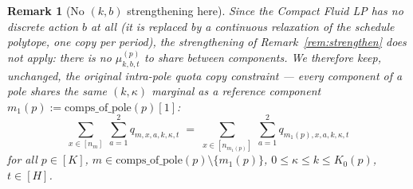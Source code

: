 \documentclass[11pt]{article}
\newtheorem{remark}{Remark}
\begin{document}
\begin{remark}[No $(k,b)$ strengthening here]
Since the Compact Fluid LP has no discrete action $b$ at all (it is replaced by a
continuous relaxation of the schedule polytope, one copy per period), the strengthening of
Remark~\ref{rem:strengthen} does not apply: there is no $\mu^{(p)}_{k,b,t}$ to share
between components. We therefore keep, unchanged, the original \emph{intra-pole quota
copy} constraint --- every component of a pole shares the same $(k,\kappa)$ marginal as a
reference component $m_1(p) := \mathrm{comps\_of\_pole}(p)[1]$:
\[
  \sum_{x \in [n_m]}\ \sum_{a=1}^{2} q_{m,x,a,k,\kappa,t}
  \;=\;
  \sum_{x \in [n_{m_1(p)}]}\ \sum_{a=1}^{2} q_{m_1(p),x,a,k,\kappa,t}
  \tag{Quota-copy}
\]
for all $p \in [K]$, $m \in \mathrm{comps\_of\_pole}(p) \setminus \{m_1(p)\}$,
$0 \le \kappa \le k \le K_0(p)$, $t \in [H]$.
\end{remark}
\end{document}
